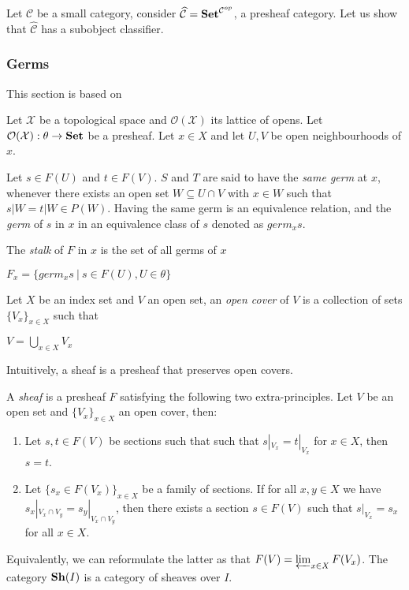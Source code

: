 \documentclass[a4paper]{article}
\theoremstyle{defin}
\theoremstyle{theorem}
\theoremstyle{claim}
\theoremstyle{prop}
\theoremstyle{lemma}
\theoremstyle{fact}
\theoremstyle{ex}
\theoremstyle{col}
\begin{document}
Let $\mathcal{C}$ be a small category, consider $\widehat{\mathcal{C}} = {\bf Set}^{\mathcal{C}^{op}}$, a presheaf category. Let us show that $\widehat{\mathcal{C}}$ has a subobject classifier.

\subsubsection{Germs}

This section is based on \cite[Chapter II, paragraph 5]{maclane2012sheaves}

Let $\mathcal{X}$ be a topological space and $\mathcal{O}(\mathcal{X})$ its lattice of opens. Let $\mathcal{O}(\mathcal{X}) : \theta \to {\bf Set}$ be a presheaf. Let $x \in X$ and let $U, V$ be open neighbourhoods of $x$.

Let $s \in F(U)$ and $t \in F(V)$. $S$ and $T$ are said to have the \emph{same germ} at $x$, whenever there exists an open set $W \subseteq U \cap V$ with $x \in W$ such that $s|W = t|W \in P(W)$. Having the same germ is an equivalence relation, and the \emph{germ} of $s$ in $x$ in an equivalence class of $s$ denoted as $germ_x s$.

The \emph{stalk} of $F$ in $x$ is the set of all germs of $x$
\begin{center}
$F_x = \{ germ_x s \: | \: s \in F(U), U \in \theta \}$
\end{center}

Let $X$ be an index set and $V$ an open set, an \emph{open cover} of $V$ is a collection of sets $\{ V_x\}_{x \in X}$ such that
\begin{center}
$V = \bigcup \limits_{x \in X} V_x$
\end{center}

Intuitively, a sheaf is a presheaf that preserves open covers.

A \emph{sheaf} is a presheaf $F$ satisfying the following two extra-principles. Let $V$ be an open set and $\{V_x
\}_{x \in X}$ an open cover, then:
\begin{enumerate}
\item Let $s, t \in F(V)$ be sections such that such that $s|_{V_x} = t|_{V_x}$ for $x \in X$, then $s = t$.
\item Let $\{ s_x \in F(V_x) \}_{x \in X}$ be a family of sections. If for all $x, y \in X$ we have $s_x|_{V_x \cap V_y} = s_y|_{V_x \cap V_y}$, then there exists a section $s \in F(V)$ such that $s|_{V_x} = s_x$ for all $x \in X$.
\end{enumerate}
Equivalently, we can reformulate the latter as that $F(V) = \varprojlim_{x \in X} F(V_x)$.
The category ${\bf Sh}(I)$ is a category of sheaves over $I$.
\end{document}
